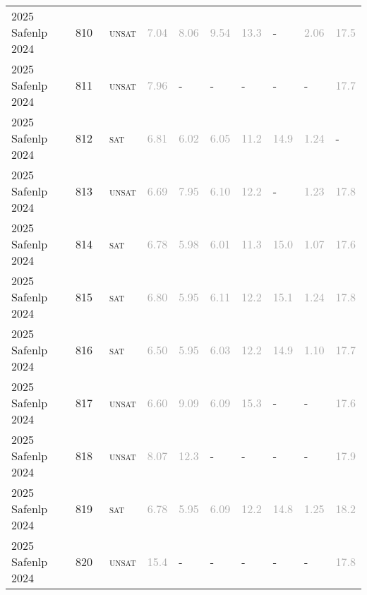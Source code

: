\begin{center}
{\begin{longtable}{@{}llllllllll@{}}
2025 Safenlp 2024 & 810 & ~\textsc{unsat} & \textcolor{darkgray}{7.04} & \textcolor{darkgray}{8.06} & \textcolor{darkgray}{9.54} & \textcolor{darkgray}{13.3} & - & \textcolor{darkgray}{2.06} & \textcolor{darkgray}{17.5} \\
2025 Safenlp 2024 & 811 & ~\textsc{unsat} & \textcolor{darkgray}{7.96} & - & - & - & - & - & \textcolor{darkgray}{17.7} \\
2025 Safenlp 2024 & 812 & ~\textsc{sat} & \textcolor{darkgray}{6.81} & \textcolor{darkgray}{6.02} & \textcolor{darkgray}{6.05} & \textcolor{darkgray}{11.2} & \textcolor{darkgray}{14.9} & \textcolor{darkgray}{1.24} & - \\
2025 Safenlp 2024 & 813 & ~\textsc{unsat} & \textcolor{darkgray}{6.69} & \textcolor{darkgray}{7.95} & \textcolor{darkgray}{6.10} & \textcolor{darkgray}{12.2} & - & \textcolor{darkgray}{1.23} & \textcolor{darkgray}{17.8} \\
2025 Safenlp 2024 & 814 & ~\textsc{sat} & \textcolor{darkgray}{6.78} & \textcolor{darkgray}{5.98} & \textcolor{darkgray}{6.01} & \textcolor{darkgray}{11.3} & \textcolor{darkgray}{15.0} & \textcolor{darkgray}{1.07} & \textcolor{darkgray}{17.6} \\
2025 Safenlp 2024 & 815 & ~\textsc{sat} & \textcolor{darkgray}{6.80} & \textcolor{darkgray}{5.95} & \textcolor{darkgray}{6.11} & \textcolor{darkgray}{12.2} & \textcolor{darkgray}{15.1} & \textcolor{darkgray}{1.24} & \textcolor{darkgray}{17.8} \\
2025 Safenlp 2024 & 816 & ~\textsc{sat} & \textcolor{darkgray}{6.50} & \textcolor{darkgray}{5.95} & \textcolor{darkgray}{6.03} & \textcolor{darkgray}{12.2} & \textcolor{darkgray}{14.9} & \textcolor{darkgray}{1.10} & \textcolor{darkgray}{17.7} \\
2025 Safenlp 2024 & 817 & ~\textsc{unsat} & \textcolor{darkgray}{6.60} & \textcolor{darkgray}{9.09} & \textcolor{darkgray}{6.09} & \textcolor{darkgray}{15.3} & - & - & \textcolor{darkgray}{17.6} \\
2025 Safenlp 2024 & 818 & ~\textsc{unsat} & \textcolor{darkgray}{8.07} & \textcolor{darkgray}{12.3} & - & - & - & - & \textcolor{darkgray}{17.9} \\
2025 Safenlp 2024 & 819 & ~\textsc{sat} & \textcolor{darkgray}{6.78} & \textcolor{darkgray}{5.95} & \textcolor{darkgray}{6.09} & \textcolor{darkgray}{12.2} & \textcolor{darkgray}{14.8} & \textcolor{darkgray}{1.25} & \textcolor{darkgray}{18.2} \\
2025 Safenlp 2024 & 820 & ~\textsc{unsat} & \textcolor{darkgray}{15.4} & - & - & - & - & - & \textcolor{darkgray}{17.8} \\

\end{longtable}}
\end{center}
